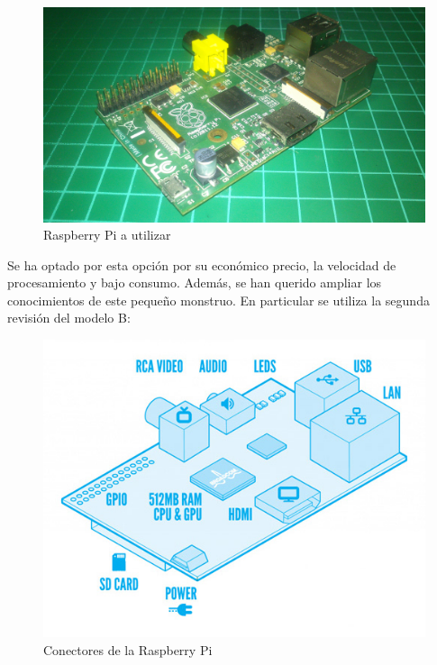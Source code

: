 \documentclass[twoside,11pt]{report}
\begin{document}
\begin{figure}[h!]
\begin{center}
\includegraphics[scale=0.06]{images/RPi.jpg}
\caption{Raspberry Pi a utilizar}
\label{RPiImage}
\end{center}
\end{figure}

Se ha optado por esta opción por su económico precio, la velocidad de procesamiento y bajo consumo. Además, se han querido ampliar los conocimientos de este pequeño monstruo. En particular se utiliza la segunda revisión del modelo B:

\begin{figure}[h!]
\begin{center}
\includegraphics[scale=0.3]{images/RPi2.jpg}
\caption{Conectores de la Raspberry Pi}
\label{RPiConn}
\end{center}
\end{figure}
\end{document}
